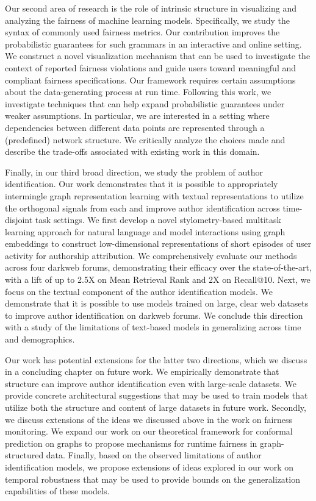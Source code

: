 Our second area of research is the role of intrinsic structure in visualizing and analyzing the fairness of machine learning models.
Specifically, we study the syntax of commonly used fairness metrics.
Our contribution improves the probabilistic guarantees for such grammars in an interactive and online setting.
We construct a novel visualization mechanism that can be used to investigate the context of reported fairness violations and guide users toward meaningful and compliant fairness specifications.
Our framework requires certain assumptions about the data-generating process at run time.
Following this work, we investigate techniques that can help expand probabilistic guarantees under weaker assumptions.
In particular, we are interested in a setting where dependencies between different data points are represented through a (predefined) network structure. 
We critically analyze the choices made and describe the trade-offs associated with existing work in this domain.

Finally, in our third broad direction, we study the problem of author identification.
Our work demonstrates that it is possible to appropriately intermingle graph representation learning with textual representations to utilize the orthogonal signals from each and improve author identification across time-disjoint task settings.
We first develop a novel stylometry-based multitask learning approach for natural language and model interactions using graph embeddings to construct low-dimensional representations of short episodes of user activity for authorship attribution. 
We comprehensively evaluate our methods across four darkweb forums, demonstrating their efficacy over the state-of-the-art, with a lift of up to 2.5X on Mean Retrieval Rank and 2X on Recall@10.
Next, we focus on the textual component of the author identification models.
We demonstrate that it is possible to use models trained on large, clear web datasets to improve author identification on darkweb forums.
We conclude this direction with a study of the limitations of text-based models in generalizing across time and demographics.

Our work has potential extensions for the latter two directions, which we discuss in a concluding chapter on future work.
We empirically demonstrate that structure can improve author identification even with large-scale datasets.
We provide concrete architectural suggestions that may be used to train models that utilize both the structure and content of large datasets in future work.
Secondly, we discuss extensions of the ideas we discussed above in the work on fairness monitoring.
We expand our work on our theoretical framework for conformal prediction on graphs to propose mechanisms for runtime fairness in graph-structured data.
Finally, based on the observed limitations of author identification models, we propose extensions of ideas explored in our work on temporal robustness that may be used to provide bounds on the generalization capabilities of these models.

\endinput
